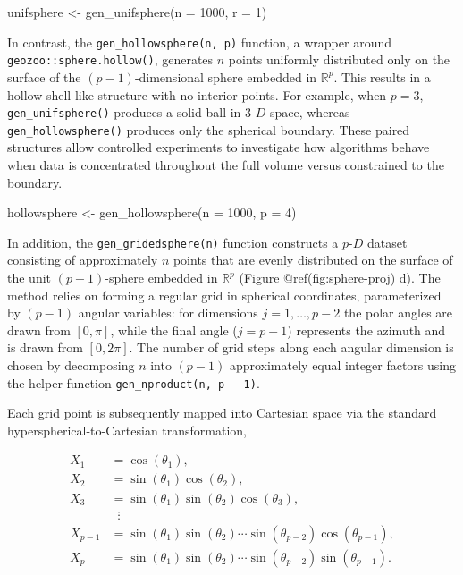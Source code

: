 \documentclass[
  11pt,
  a4paper,
]{report}
\newenvironment{Shaded}{\begin{snugshade}}{\end{snugshade}}
\newcommand{\AttributeTok}[1]{\textcolor[rgb]{0.40,0.45,0.13}{#1}}
\newcommand{\DecValTok}[1]{\textcolor[rgb]{0.68,0.00,0.00}{#1}}
\newcommand{\FunctionTok}[1]{\textcolor[rgb]{0.28,0.35,0.67}{#1}}
\newcommand{\NormalTok}[1]{\textcolor[rgb]{0.00,0.23,0.31}{#1}}
\newcommand{\OtherTok}[1]{\textcolor[rgb]{0.00,0.23,0.31}{#1}}
\begin{document}
\begin{Shaded}
\begin{Highlighting}[]
\NormalTok{unifsphere }\OtherTok{\textless{}{-}} \FunctionTok{gen\_unifsphere}\NormalTok{(}\AttributeTok{n =} \DecValTok{1000}\NormalTok{, }\AttributeTok{r =} \DecValTok{1}\NormalTok{)}
\end{Highlighting}
\end{Shaded}

In contrast, the \texttt{gen\_hollowsphere(n,\ p)} function, a wrapper
around \texttt{geozoo::sphere.hollow()}, generates \(n\) points
uniformly distributed only on the surface of the \((p-1)\)-dimensional
sphere embedded in \(\mathbb{R}^p\). This results in a hollow shell-like
structure with no interior points. For example, when \(p=3\),
\texttt{gen\_unifsphere()} produces a solid ball in \(3\text{-}D\)
space, whereas \texttt{gen\_hollowsphere()} produces only the spherical
boundary. These paired structures allow controlled experiments to
investigate how algorithms behave when data is concentrated throughout
the full volume versus constrained to the boundary.

\begin{Shaded}
\begin{Highlighting}[]
\NormalTok{hollowsphere }\OtherTok{\textless{}{-}} \FunctionTok{gen\_hollowsphere}\NormalTok{(}\AttributeTok{n =} \DecValTok{1000}\NormalTok{, }\AttributeTok{p =} \DecValTok{4}\NormalTok{)}
\end{Highlighting}
\end{Shaded}

In addition, the \texttt{gen\_gridedsphere(n)} function constructs a
\(p\text{-}D\) dataset consisting of approximately \(n\) points that are
evenly distributed on the surface of the unit \((p-1)\)-sphere embedded
in \(\mathbb{R}^p\) (Figure @ref(fig:sphere-proj) d). The method relies
on forming a regular grid in spherical coordinates, parameterized by
\((p-1)\) angular variables: for dimensions \(j = 1, \dots, p-2\) the
polar angles are drawn from \([0, \pi]\), while the final angle
(\(j = p-1\)) represents the azimuth and is drawn from \([0, 2\pi]\).
The number of grid steps along each angular dimension is chosen by
decomposing \(n\) into \((p-1)\) approximately equal integer factors
using the helper function \texttt{gen\_nproduct(n,\ p\ -\ 1)}.

Each grid point is subsequently mapped into Cartesian space via the
standard hyperspherical-to-Cartesian transformation,

\[
\begin{aligned}
X_1 &= \cos(\theta_1), \\
X_2 &= \sin(\theta_1)\cos(\theta_2), \\
X_3 &= \sin(\theta_1)\sin(\theta_2)\cos(\theta_3), \\
&\;\;\vdots \\
X_{p-1} &= \sin(\theta_1)\sin(\theta_2)\cdots \sin(\theta_{p-2})\cos(\theta_{p-1}), \\
X_p &= \sin(\theta_1)\sin(\theta_2)\cdots \sin(\theta_{p-2})\sin(\theta_{p-1}).
\end{aligned}
\]
\end{document}
